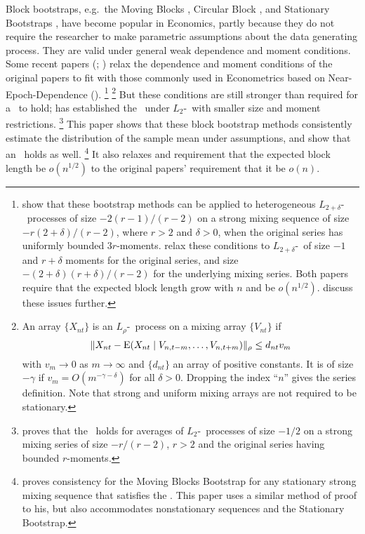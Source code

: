 \documentclass[11pt]{article}
\begin{document}
\newpage
\noindent Block bootstraps, e.g.\ the Moving Blocks
\citep{Kun:89,LiS:92}, Circular Block \citep{PoR:92}, and Stationary
Bootstraps \citep{PoR:94}, have become popular in Economics, partly
because they do not require the researcher to make parametric
assumptions about the data generating process.  They are valid under
general weak dependence and moment conditions.  Some recent papers
(\citealp{GoW:02}; \citealp{GoJ:03}) relax the dependence and moment
conditions of the original papers to fit with those commonly used in
Econometrics based on Near-Epoch-Dependence (\ned).%
\footnote{\citet{GoW:02} show that these bootstrap methods can be
  applied to heterogeneous $L_{2+\delta}$-\ned\ processes of size
  $-2(r-1)/(r-2)$ on a strong mixing sequence of size
  $-r(2+\delta)/(r-2)$, where $r > 2$ and $\delta >0$, when the
  original series has uniformly bounded $3r$-moments.  \citet{GoJ:03}
  relax these conditions to $L_{2+\delta}$-\ned\ of size $-1$ and
  $r+\delta$ moments for the original series, and size
  $-(2+\delta)(r+\delta)/(r-2)$ for the underlying mixing series.
  Both papers require that the expected block length grow with $n$ and
  be $o(n^{1/2})$.  \cite{GoP:11} discuss these issues further.}%
\footnote{An array $\{X_{nt}\}$ is an $L_{\rho}$-\ned\ process on a
  mixing array $\{V_{nt}\}$ if
  \begin{equation}
    \| X_{nt} - \operatorname{E}(X_{nt}
    \mid V_{n,t-m},\dots,V_{n,t+m}) \|_{\rho} \leq d_{nt} v_m
  \end{equation}
  with $v_m \to 0$ as $m \to \infty$ and $\{d_{nt}\}$ an array of
  positive constants.  It is of size $-\gamma$ if $v_m = O(m^{-\gamma
    - \delta})$ for all $\delta>0$.  Dropping the index ``$n$'' gives
  the series definition.  Note that strong and uniform mixing arrays
  are not required to be stationary.} %
But these conditions are still stronger than
required for a \clt\ to hold; \citet{Jon:97} has established the \clt\
under $L_2$-\ned\ with smaller size and moment
restrictions.%
\footnote{\citet{Jon:97} proves that the \clt\ holds for averages of
  $L_2$-\ned\ processes of size $-1/2$ on a strong mixing series of
  size $-r/(r-2)$, $r > 2$ and the original series having bounded
  $r$-moments.} %
This paper shows that these block bootstrap
methods consistently estimate the distribution of the sample mean
under \citepos{Jon:97} assumptions, and show that an \fclt\ holds as
well.%
\footnote{\citet{Rad:96} proves consistency for the Moving Blocks
  Bootstrap for any stationary strong mixing sequence that satisfies
  the \clt. This paper uses a similar method of proof to his, but also
  accommodates nonstationary sequences and the Stationary
  Bootstrap.} %
It also relaxes  and  requirement that
the expected block length be $o(n^{1/2})$ to the original papers'
requirement that it be $o(n)$.
\end{document}
